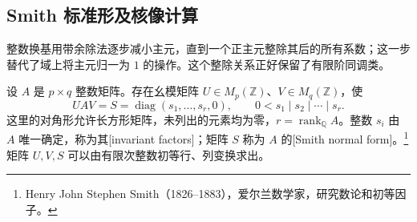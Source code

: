 \subsection{Smith 标准形及核像计算}
\label{g2:subsec:0304:02}

整数换基用带余除法逐步减小主元，直到一个正主元整除其后的所有系数；这一步替代了域上将主元归一为 \(1\) 的操作。这个整除关系正好保留了有限阶同调类。

\begin{theorem}\label{g2:thm:smith-normal-form}
	设 \(A\) 是 \(p\times q\) 整数矩阵。存在幺模矩阵 \(U\in M_p(\mathbb Z)\)、\(V\in M_q(\mathbb Z)\)，使
	\[
		UAV=S=\operatorname{diag}(s_1,\ldots,s_r,0),\qquad
		0<s_1\mid s_2\mid\cdots\mid s_r.
	\]
	这里的对角形允许长方形矩阵，未列出的元素均为零，\(r=\operatorname{rank}_{\mathbb Q}A\)。整数 \(s_i\) 由 \(A\) 唯一确定，称为其[invariant factors]；矩阵 \(S\) 称为 \(A\) 的[Smith normal form]。\footnote{Henry John Stephen Smith（1826--1883），爱尔兰数学家，研究数论和初等因子。}矩阵 \(U,V,S\) 可以由有限次整数初等行、列变换求出。
\end{theorem}
